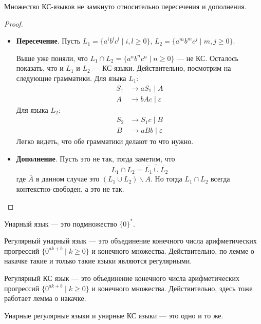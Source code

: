 \begin{theorem}
  Множество КС-языков не замкнуто относительно пересечения и дополнения.
\end{theorem}
\begin{proof} \quad
  \begin{itemize}
    \item \textbf{Пересечение}. Пусть $L_1 = \{a^i b^l c^l \; | \; i, l \geq 0\}$, $L_2  = \{a^m b^m c^j \; | \; m, j \geq 0\}$. 

    Выше уже поняли, что $L_1 \cap L_2 = \{a^n b^n c^n \; | \; n \geq 0\}$ --- не КС. Осталось показать, что и $L_1$ и $L_2$ --- КС-языки. Действительно, посмотрим на следующие грамматики. Для языка $L_1$:
     \begin{align*}
       S_1 &\to aS_1 \; | \; A \\
       A &\to bAc \; | \; \varepsilon
     \end{align*}
     Для языка $L_2$:
     \begin{align*}
       S_2 &\to S_1c \; | \; B \\
       B &\to aBb \; | \; \varepsilon
     \end{align*}
     Легко видеть, что обе грамматики делают то что нужно.
    \item \textbf{Дополнение}. Пусть это не так, тогда заметим, что
    \begin{equation*}
      L_1 \cap L_2 = \overline{\overline{L_1} \cup \overline{L_2}}
    \end{equation*}
    где $\overline{A}$ в данном случае это $(L_1 \cup L_2) \backslash A$. Но тогда $L_1 \cap L_2$ всегда контекстно-свободен, а это не так.
  \end{itemize}
\end{proof}

\begin{conj}
  Унарный язык --- это подмножество $\{0\}^{*}$.
\end{conj}
\begin{conj}
  Регулярный унарный язык --- это объединение конечного числа арифметических прогрессий $\{0^{ak + b} \; | \; k \geq 0\}$ и конечного множества. Действительно, по лемме о накачке такие и только такие языки являются регулярными.
\end{conj}
\begin{conj}
  Регулярный КС язык --- это объединение конечного числа арифметических прогрессий $\{0^{ak + b} \; | \; k \geq 0\}$ и конечного множества. Действительно, здесь тоже работает лемма о накачке.
\end{conj}
\begin{follow}
  Унарные регулярные языки и унарные КС языки --- это одно и то же.
\end{follow}
